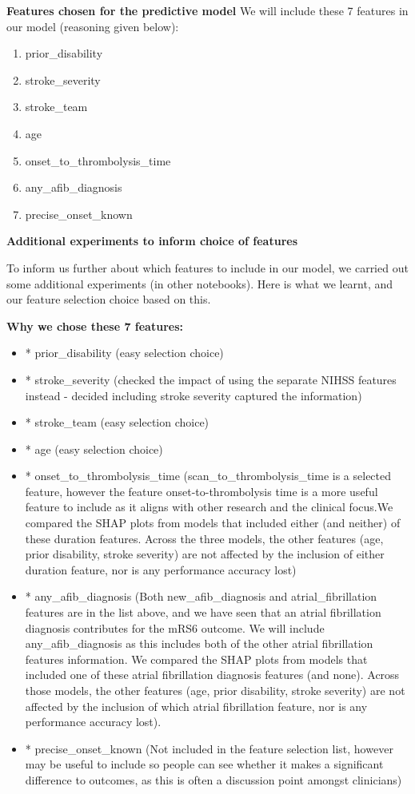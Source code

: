 \textbf{Features chosen for the predictive model}
We will include these 7 features in our model (reasoning given below):
\begin{enumerate}
    \item prior\_disability
    \item stroke\_severity
    \item stroke\_team
    \item age
    \item onset\_to\_thrombolysis\_time
    \item any\_afib\_diagnosis
    \item precise\_onset\_known
\end{enumerate}

\textbf{Additional experiments to inform choice of features}

To inform us further about which features to include in our model, we carried out some additional experiments (in other notebooks). Here is what we learnt, and our feature selection choice based on this.

\textbf{Why we chose these 7 features:}
\begin{itemize}
    \item * prior\_disability (easy selection choice)
    \item * stroke\_severity (checked the impact of using the separate NIHSS features instead - decided including stroke severity captured the information)
    \item * stroke\_team (easy selection choice)
    \item * age (easy selection choice)
    \item * onset\_to\_thrombolysis\_time (scan\_to\_thrombolysis\_time is a selected feature, however the feature onset-to-thrombolysis time is a more useful feature to include as it aligns with other research and the clinical focus.We compared the SHAP plots from models that included either (and neither) of these duration features. Across the three models, the other features (age, prior disability, stroke severity) are not affected by the inclusion of either duration feature, nor is any performance accuracy lost)
    \item * any\_afib\_diagnosis (Both new\_afib\_diagnosis and atrial\_fibrillation features are in the list above, and we have seen that an atrial fibrillation diagnosis contributes for the mRS6 outcome. We will include any\_afib\_diagnosis as this includes both of the other atrial fibrillation features information. We compared the SHAP plots from models that included one of these atrial fibrillation diagnosis features (and none). Across those models, the other features (age, prior disability, stroke severity) are not affected by the inclusion of which atrial fibrillation feature, nor is any performance accuracy lost).
    \item * precise\_onset\_known (Not included in the feature selection list, however may be useful to include so people can see whether it makes a significant difference to outcomes, as this is often a discussion point amongst clinicians)
\end{itemize}

